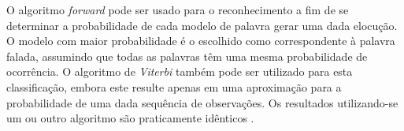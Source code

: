 O algoritmo \textit{forward} pode ser usado para o reconhecimento a fim de se determinar a probabilidade de cada modelo de palavra gerar uma dada elocução. O modelo com maior probabilidade é o escolhido como correspondente à palavra falada, assumindo que todas as palavras têm uma mesma probabilidade de ocorrência. O algoritmo de \textit{Viterbi} também pode ser utilizado para esta classificação, embora este resulte apenas em uma aproximação
para a probabilidade de uma dada sequência de observações. Os resultados utilizando-se um ou outro algoritmo são praticamente idênticos \cite{RavIsolAnderson}.




 





